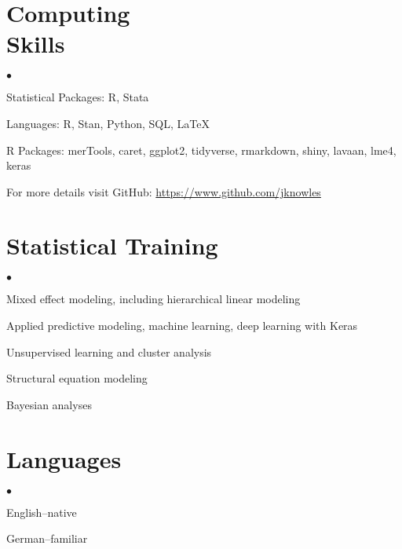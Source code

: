 \documentclass[margin,line]{res}
\newenvironment{list2}{
  \begin{list}{$\bullet$}{%
      \setlength{\itemsep}{0in}
      \setlength{\parsep}{0in} \setlength{\parskip}{0in}
      \setlength{\topsep}{0in} \setlength{\partopsep}{0in} 
      \setlength{\leftmargin}{0.2in}}}{\end{list}}
\begin{document}
\begin{resume}
\section{\sc Computing \\ Skills} 
\begin{list2}
\item Statistical Packages: R, Stata
\item Languages:  R, Stan, Python, SQL, \LaTeX
\item R Packages: merTools, caret, ggplot2, tidyverse, rmarkdown, shiny, lavaan, lme4, keras
\item For more details visit GitHub: \url{https://www.github.com/jknowles}\\
\end{list2}

\section{\sc Statistical Training}
\begin{list2}
\item Mixed effect modeling, including hierarchical linear modeling
\item Applied predictive modeling, machine learning, deep learning with Keras
\item Unsupervised learning and cluster analysis
\item Structural equation modeling
\item Bayesian analyses
\end{list2}

\vspace{-2mm}
\section{\sc Languages}

\begin{list2}
\item English--native
\item German--familiar
\end{list2}


\end{resume}
\end{document}
